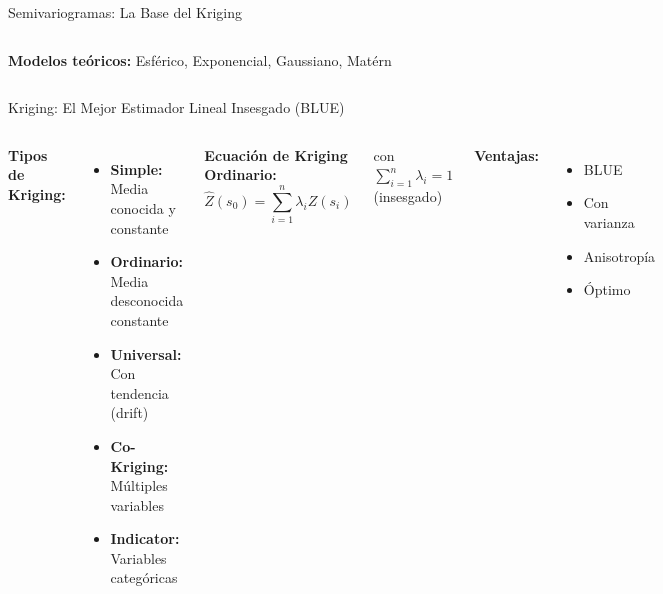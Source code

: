 \documentclass[10pt,aspectratio=169]{beamer}
\begin{document}
\begin{frame}{Semivariogramas: La Base del Kriging}
\begin{columns}[T]
        
        \textbf{Modelos teóricos:}
        Esférico, Exponencial, Gaussiano, Matérn
    \end{columns}
\end{frame}

\begin{frame}{Kriging: El Mejor Estimador Lineal Insesgado (BLUE)}
    \begin{columns}[T]
        \textbf{Tipos de Kriging:}
        \begin{itemize}
            \item \textbf{Simple:} Media conocida y constante
            \item \textbf{Ordinario:} Media desconocida constante
            \item \textbf{Universal:} Con tendencia (drift)
            \item \textbf{Co-Kriging:} Múltiples variables
            \item \textbf{Indicator:} Variables categóricas
        \end{itemize}
        
        \vspace{0.3cm}
        \textbf{Ecuación de Kriging Ordinario:}
        $$\hat{Z}(s_0) = \sum_{i=1}^n \lambda_i Z(s_i)$$
        
        con $\sum_{i=1}^n \lambda_i = 1$ (insesgado)
        
        \textbf{Ventajas:}
        \begin{itemize}
            \item[\faCheckCircle] BLUE
            \item[\faCheckCircle] Con varianza
            \item[\faCheckCircle] Anisotropía
            \item[\faCheckCircle] Óptimo
        \end{itemize}
        

\end{columns}
\end{frame}
\end{document}
